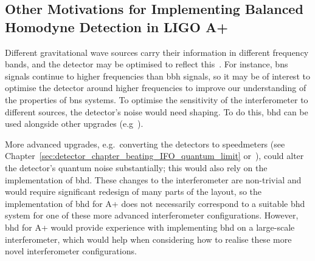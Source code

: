 \subsection{Other Motivations for Implementing Balanced Homodyne Detection in LIGO A+}
\label{sec:BHD_for_ligo_BHD_alt_motivation}
Different gravitational wave sources carry their information in different frequency bands, and the detector may be optimised to reflect this~\cite{McClelland2011,squeezing_sql_2011a,McCuller2020,Kimble2001}. For instance, \gls{bns} signals continue to higher frequencies than \gls{bbh} signals, so it may be of interest to optimise the detector around higher frequencies to improve our understanding of the properties of \gls{bns} systems. To optimise the sensitivity of the interferometer to different sources, the detector's noise would need shaping. To do this, \gls{bhd} can be used alongside other upgrades (e.g~\cite{Kimble2001,Zhang2020}).
\par
More advanced upgrades, e.g.~converting the detectors to speedmeters (see Chapter~\ref{sec:detector_chapter_beating_IFO_quantum_limit} or~\cite{Kimble2001}), could alter the detector's quantum noise substantially; this would also rely on the implementation of \gls{bhd}. These changes to the interferometer are non-trivial and would require significant redesign of many parts of the layout, so the implementation of \gls{bhd} for A+ does not necessarily correspond to a suitable \gls{bhd} system for one of these more advanced interferometer configurations. However, \gls{bhd} for A+ would provide experience with implementing \gls{bhd} on a large-scale interferometer, which would help when considering how to realise these more novel interferometer configurations.
\par
